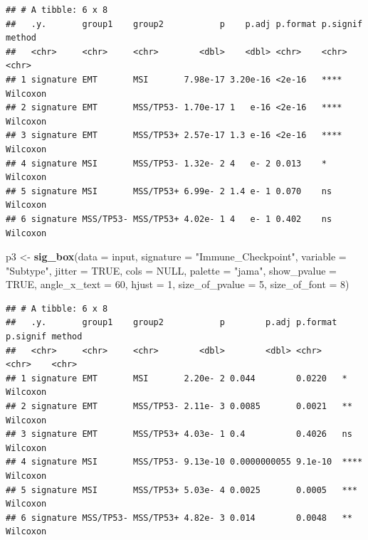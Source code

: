 \documentclass[
  12pt,
]{book}
\newenvironment{Shaded}{\begin{snugshade}}{\end{snugshade}}
\newcommand{\AttributeTok}[1]{\textcolor[rgb]{0.13,0.29,0.53}{#1}}
\newcommand{\ConstantTok}[1]{\textcolor[rgb]{0.56,0.35,0.01}{#1}}
\newcommand{\DecValTok}[1]{\textcolor[rgb]{0.00,0.00,0.81}{#1}}
\newcommand{\FunctionTok}[1]{\textcolor[rgb]{0.13,0.29,0.53}{\textbf{#1}}}
\newcommand{\NormalTok}[1]{#1}
\newcommand{\OtherTok}[1]{\textcolor[rgb]{0.56,0.35,0.01}{#1}}
\newcommand{\StringTok}[1]{\textcolor[rgb]{0.31,0.60,0.02}{#1}}
\begin{document}
\begin{verbatim}
## # A tibble: 6 x 8
##   .y.       group1    group2           p    p.adj p.format p.signif method  
##   <chr>     <chr>     <chr>        <dbl>    <dbl> <chr>    <chr>    <chr>   
## 1 signature EMT       MSI       7.98e-17 3.20e-16 <2e-16   ****     Wilcoxon
## 2 signature EMT       MSS/TP53- 1.70e-17 1   e-16 <2e-16   ****     Wilcoxon
## 3 signature EMT       MSS/TP53+ 2.57e-17 1.3 e-16 <2e-16   ****     Wilcoxon
## 4 signature MSI       MSS/TP53- 1.32e- 2 4   e- 2 0.013    *        Wilcoxon
## 5 signature MSI       MSS/TP53+ 6.99e- 2 1.4 e- 1 0.070    ns       Wilcoxon
## 6 signature MSS/TP53- MSS/TP53+ 4.02e- 1 4   e- 1 0.402    ns       Wilcoxon
\end{verbatim}

\begin{Shaded}
\begin{Highlighting}[]
\NormalTok{p3 }\OtherTok{\textless{}{-}} \FunctionTok{sig\_box}\NormalTok{(}\AttributeTok{data           =}\NormalTok{ input, }
              \AttributeTok{signature      =} \StringTok{"Immune\_Checkpoint"}\NormalTok{,}
              \AttributeTok{variable       =} \StringTok{"Subtype"}\NormalTok{,}
              \AttributeTok{jitter          =} \ConstantTok{TRUE}\NormalTok{,}
              \AttributeTok{cols           =} \ConstantTok{NULL}\NormalTok{,}
              \AttributeTok{palette        =} \StringTok{"jama"}\NormalTok{,}
              \AttributeTok{show\_pvalue    =} \ConstantTok{TRUE}\NormalTok{,}
              \AttributeTok{angle\_x\_text   =} \DecValTok{60}\NormalTok{, }
              \AttributeTok{hjust          =} \DecValTok{1}\NormalTok{, }
              \AttributeTok{size\_of\_pvalue =} \DecValTok{5}\NormalTok{, }
              \AttributeTok{size\_of\_font   =} \DecValTok{8}\NormalTok{)}
\end{Highlighting}
\end{Shaded}

\begin{verbatim}
## # A tibble: 6 x 8
##   .y.       group1    group2           p        p.adj p.format p.signif method  
##   <chr>     <chr>     <chr>        <dbl>        <dbl> <chr>    <chr>    <chr>   
## 1 signature EMT       MSI       2.20e- 2 0.044        0.0220   *        Wilcoxon
## 2 signature EMT       MSS/TP53- 2.11e- 3 0.0085       0.0021   **       Wilcoxon
## 3 signature EMT       MSS/TP53+ 4.03e- 1 0.4          0.4026   ns       Wilcoxon
## 4 signature MSI       MSS/TP53- 9.13e-10 0.0000000055 9.1e-10  ****     Wilcoxon
## 5 signature MSI       MSS/TP53+ 5.03e- 4 0.0025       0.0005   ***      Wilcoxon
## 6 signature MSS/TP53- MSS/TP53+ 4.82e- 3 0.014        0.0048   **       Wilcoxon
\end{verbatim}
\end{document}
